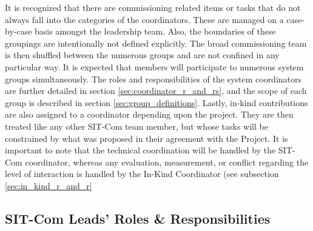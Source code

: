 \documentclass[SE,lsstdraft,authoryear,toc]{lsstdoc, lsstdraft}
\begin{document}
It is recognized that there are commissioning related items or tasks that do not always fall into the categories of the coordinators.
These are managed on a case-by-case basis amongst the leadership team.
Also, the boundaries of these groupings are intentionally not defined explicitly.
The broad commissioning team is then shuffled between the numerous groups and are not confined in any particular way.
It is expected that members will participate to numerous system groups simultaneously.
The roles and responsibilities of the system coordinators are further detailed in section \ref{sec:coordinator_r_and_rs}, and the scope of each group is described in section \ref{sec:group_definitions}.
Lastly, in-kind contributions are also assigned to a coordinator depending upon the project.
They are then treated like any other SIT-Com team member, but whose tasks will be constrained by what was proposed in their agreement with the Project.
It is important to note that the technical coordination will be handled by the SIT-Com coordinator, whereas any evaluation, measurement, or conflict regarding the level of interaction is handled by the In-Kind Coordinator (see subsection \ref{sec:in_kind_r_and_r}

\subsection{SIT-Com Leads’ Roles \& Responsibilities}
\label{sec:r_and_rs}
\end{document}
